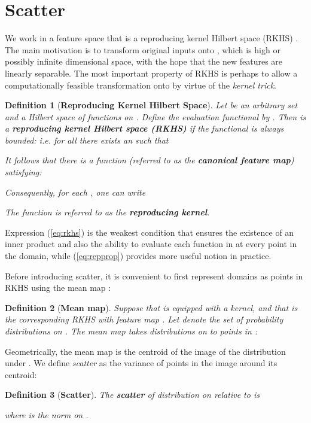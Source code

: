 \documentclass[10pt,journal,compsoc]{IEEEtran}
\newtheorem{defn}{Definition}
\begin{document}
\section{Scatter}
\label{sec:scatter}
We work in a feature space that is a reproducing kernel Hilbert space (RKHS) .
The main motivation is to transform original inputs onto , which is high or possibly infinite dimensional space, with the hope that the new features are linearly separable.
The most important property of RKHS is perhaps to allow a computationally feasible transformation onto  by virtue of the \emph{kernel trick}.
\begin{defn}[\textbf{Reproducing Kernel Hilbert Space}] 
\label{d:rkhs}
 Let  be an arbitrary set and  a Hilbert space of functions on . Define the evaluation functional  by . Then  is a \textbf{reproducing kernel Hilbert space (RKHS)} if the functional  is always bounded: i.e.  for all  there exists an  such that
 
 It follows that there is a function  (referred to as the \textbf{canonical feature map}) satisfying: 
  
  Consequently, for each , one can write
  
  The function  is referred to as the \textbf{reproducing kernel}.
\end{defn}
\noindent Expression (\ref{eq:rkhs}) is the weakest condition that ensures the existence of an inner product and also the ability to evaluate each function in  at every point in the domain, while (\ref{eq:repprop}) provides more useful notion in practice.

Before introducing scatter, it is convenient to first represent domains as points in RKHS using the mean map \cite{smola:07}:
\begin{defn}[\textbf{Mean map}]
  \label{d:meanmap}
	Suppose that  is equipped with a kernel, and that  is the corresponding RKHS with feature map . Let  denote the set of probability distributions on . The mean map takes distributions on  to points in :
	
\end{defn}
\noindent Geometrically, the mean map is the centroid of the image of the distribution under .
We define \emph{scatter} as the variance of points in the image around its centroid:

\begin{defn}[\textbf{Scatter}]
	\label{d:scatter}
	The \textbf{scatter} of distribution  on  relative to  is
	
	where  is the norm on .
\end{defn}
\end{document}

